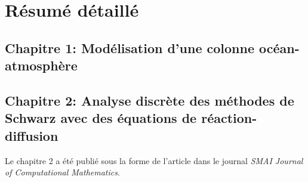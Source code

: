 \chapter*{Résumé détaillé}
\section*{Chapitre 1: Modélisation d'une colonne océan-atmosphère}
\section*{Chapitre 2: Analyse discrète des méthodes de Schwarz avec des équations de réaction-diffusion}
Le chapitre 2 a été publié sous la forme de l'article
\citep{clement_discrete_2022-1} dans le journal
\textit{SMAI Journal of Computational Mathematics}.
